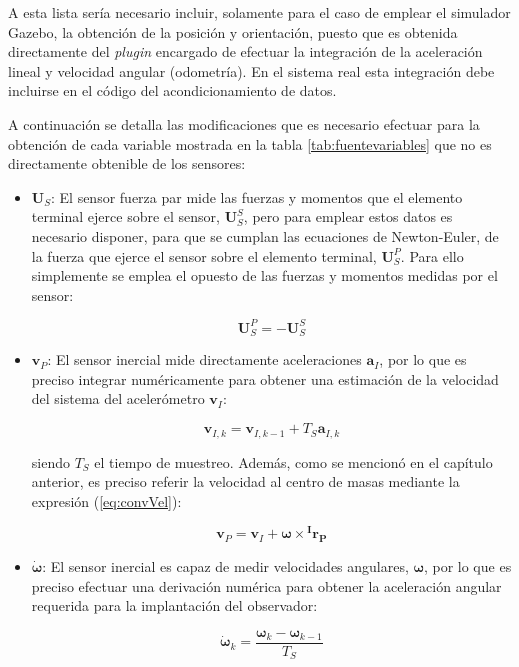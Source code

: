 A esta lista sería necesario incluir, solamente para el caso de emplear el simulador Gazebo, la obtención de la posición y orientación, puesto que es obtenida directamente del \emph{plugin} encargado de efectuar la integración de la aceleración lineal y velocidad angular (odometría). En el sistema real esta integración debe incluirse en el código del acondicionamiento de datos. \par 

A continuación se detalla las modificaciones que es necesario efectuar para la obtención de cada variable mostrada en la tabla \ref{tab:fuentevariables} que no es directamente obtenible de los sensores:

\begin{itemize}
\item $\boldsymbol{U}_S$: El sensor fuerza par mide las fuerzas y momentos que el elemento terminal ejerce sobre el sensor, $\boldsymbol{U}_S^S$, pero para emplear estos datos es necesario disponer, para que se cumplan las ecuaciones de Newton-Euler, de la fuerza que ejerce el sensor sobre el elemento terminal, $\boldsymbol{U}_S^P$. Para ello simplemente se emplea el opuesto de las fuerzas y momentos medidas por el sensor:

\[ \boldsymbol{U}_S^P = -\boldsymbol{U}_S^S \]

\item $\boldsymbol{v}_P$: El sensor inercial mide directamente aceleraciones $\boldsymbol{a}_I$, por lo que es preciso integrar numéricamente para obtener una estimación de la velocidad del sistema del acelerómetro $\boldsymbol{v}_I$:

\[ \boldsymbol{v}_{I,k} = \boldsymbol{v}_{I,k-1} + T_S \boldsymbol{a}_{I,k} \]

\noindent
siendo $T_S$ el tiempo de muestreo. Además, como se mencionó en el capítulo anterior, es preciso referir la velocidad al centro de masas mediante la expresión (\ref{eq:convVel}):

\[ \boldsymbol{v}_P = \boldsymbol{v}_I +\boldsymbol{\omega} \times \boldsymbol{^Ir_P} \]

\item $\boldsymbol{\dot{\omega}}$: El sensor inercial es capaz de medir velocidades angulares, $\boldsymbol{\omega}$, por lo que es preciso efectuar una derivación numérica para obtener la aceleración angular requerida para la implantación del observador:

\[ \boldsymbol{\dot{\omega}}_k = \frac{\boldsymbol{\omega}_k - \boldsymbol{\omega}_{k-1}}{T_S} \]


\end{itemize}
